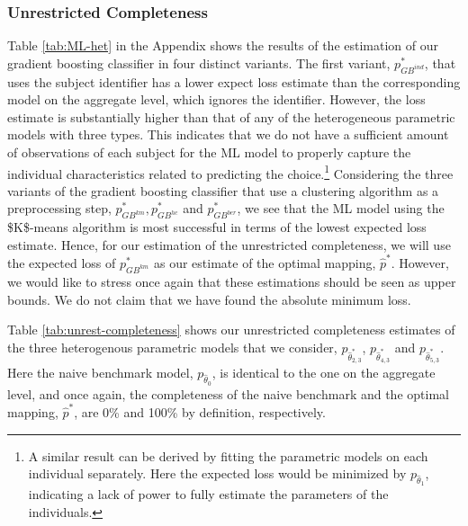 \documentclass[11pt,a4paper]{article}
\theoremstyle{definition}
\begin{document}
\subsubsection{Unrestricted Completeness}
\label{subsubsec:unrestricted_completeness_res}
Table \ref{tab:ML-het} in the Appendix shows the results of the estimation of our gradient boosting classifier in four distinct variants. The first variant, \(p^*_{GB^{ind}}\), that uses the subject identifier has a lower expect loss estimate than the corresponding model on the aggregate level, which ignores the identifier. However, the loss estimate is substantially higher than that of any of the heterogeneous parametric models with three types. This indicates that we do not have a sufficient amount of observations of each subject for the ML model to properly capture the individual characteristics related to predicting the choice.\footnote{A similar result can be derived by fitting the parametric models on each individual separately. Here the expected loss would be minimized by \(p_{\hat{\theta}_1}\), indicating a lack of power to fully estimate the parameters of the individuals.} Considering the three variants of the gradient boosting classifier that use a clustering algorithm as a preprocessing step,  \(p^*_{GB^{km}},p^*_{GB^{hc}}\) and \(p^*_{GB^{ber}}\), we see that the ML model using the \$K\$-means algorithm is most successful in terms of the lowest expected loss estimate. Hence, for our estimation of the unrestricted completeness, we will use the expected loss of \(p^*_{GB^{km}}\) as our estimate of the optimal mapping, \(\hat{p}^*\). However, we would like to stress once again that these estimations should be seen as upper bounds. We do not claim that we have found the absolute minimum loss.

Table \ref{tab:unrest-completeness} shows our unrestricted completeness estimates of the three heterogenous parametric models that we consider, \(p_{\hat{\theta}_{2,3}^*}\), \(p_{\hat{\theta}_{4,3}^*}\) and \(p_{\hat{\theta}_{5,3}^*}\). Here the naive benchmark model, \(p_{\hat{\theta}_0}\), is identical to the one on the aggregate level, and once again, the completeness of the naive benchmark and the optimal mapping, \(\hat{p}^*\), are 0\% and 100\% by definition, respectively.
\end{document}
